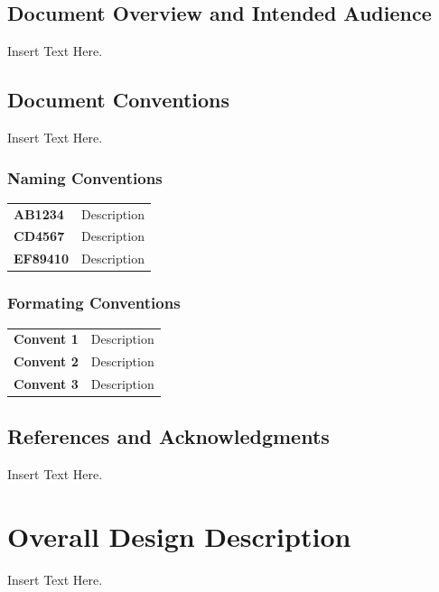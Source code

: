 \documentclass [11pt]{article}
\begin{document}
\subsection{Document Overview and Intended Audience}
Insert Text Here. 

\subsection{Document Conventions}
Insert Text Here.

 
\subsubsection{Naming Conventions}

\begin{longtable}{ |p{ }  p{ }|}  \hline
\textbf{AB1234} &  Description \\ 

\cellcolor{tableCell}\textbf{CD4567}  & \cellcolor{tableCell} Description \\ 

\textbf{EF89410} & Description \\ \hline
\end{longtable}

\subsubsection{Formating Conventions}
\begin{longtable}{ |p{ }  p{ }|}  \hline
\textbf{Convent 1} &  Description \\ 

\cellcolor{tableCell}\textbf{Convent 2}  & \cellcolor{tableCell} Description \\ 

\textbf{Convent 3} & Description \\ \hline
\end{longtable}
\subsection{References and Acknowledgments}
Insert Text Here. 



\section{Overall Design Description}
Insert Text Here. 
\end{document}
